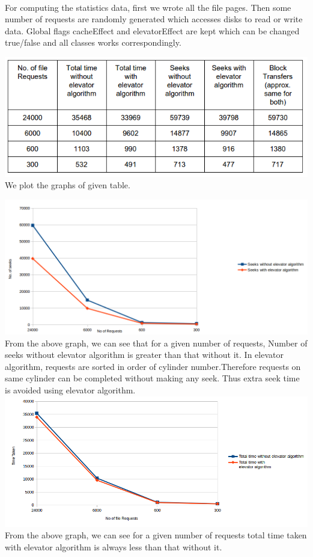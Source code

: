 \documentclass[11pt]{article}
\begin{document}
\paragraph{}
For computing the statistics data, first we wrote all the file pages. Then some number of requests are randomly generated which accesses disks to read or write data. Global flags cacheEffect and elevatorEffect are kept which can be changed true/false and all classes works correspondingly.

\includegraphics[scale = 0.60]{images/table1.png}\\
We plot the graphs of given table.

\includegraphics[scale = 0.60]{images/img0.png}\\
From the above graph, we can see that for a given number of requests, Number of seeks without elevator algorithm is greater than that without it. In elevator algorithm, requests are sorted in order of cylinder number.Therefore requests on same cylinder can be completed without making any seek. Thus extra seek time is avoided using elevator algorithm.
\includegraphics[scale = 0.60]{images/img1.png} \\
From the above graph, we can see for a given number of requests total time taken with elevator algorithm is always less than that without it. 
\end{document}
